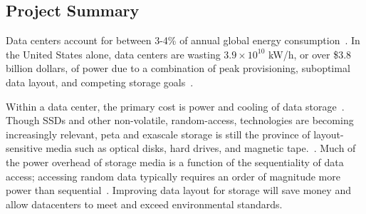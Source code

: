 
\subsection*{Project Summary}


Data centers account for between 3-4\% of annual global energy                                          
consumption~\cite{nrdc}.  In the United States alone, data centers are wasting                          
$3.9\times10^{10}$ kW/h, or over \$3.8 billion dollars, of power due to a                               
combination of peak provisioning, suboptimal data layout, and competing
storage goals~\cite{masanet,nrdc}. 

Within a data center, the primary cost is
power and cooling of data storage~\cite{baker2006fresh}. 
Though SSDs and other non-volatile, random-access, technologies are becoming increasingly
relevant, peta and exascale storage is still the province of layout-sensitive
media such as optical disks, hard drives, and magnetic tape.~\cite{TK}.  
Much of the power overhead of storage media is a function of the sequentiality
of data access; accessing random data typically requires an order of magnitude
more power than sequential~\cite{pdsw}.  Improving data layout for storage will
save money and allow datacenters to meet and exceed environmental standards.

